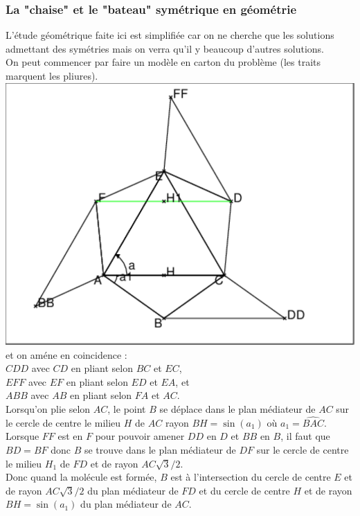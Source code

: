 \documentclass[a4paper,11pt]{book}
\begin{document}
\subsubsection{La "chaise" et le "bateau" sym\'etrique en g\'eom\'etrie}
L'\'etude g\'eom\'etrique faite ici est simplifi\'ee car on ne cherche que les 
solutions admettant des sym\'etries mais on verra qu'il y beaucoup d'autres 
solutions. \\
 On peut commencer par faire un mod\`ele en carton du probl\`eme (les traits 
marquent les pliures).\\
\includegraphics[width=\textwidth]{cyclohex1}\\
et on am\'ene en coincidence :\\
$CDD$ avec $CD$ en pliant selon $BC$ et $EC$,\\
 $EFF$ avec $EF$ en pliant selon $ED$ et $EA$, et\\
 $ABB$ avec $AB$ en pliant selon $FA$ et $AC$.\\
Lorsqu'on plie selon $AC$, le point $B$ se d\'eplace dans le plan m\'ediateur 
de $AC$ sur le cercle de centre le milieu $H$ de $AC$ rayon $BH=\sin(a_1)$ 
o\`u $a_1=\widehat{BAC}$.\\
Lorsque  $FF$ est en $F$ pour pouvoir amener  $DD$ en $D$ et $BB$ en $B$, il 
faut que $BD=BF$ donc $B$ se trouve dans le plan m\'ediateur de $DF$ sur le 
cercle de centre le milieu $H_1$ de $FD$ et de rayon $AC\sqrt 3/2$.\\
Donc quand la mol\'ecule est form\'ee, $B$ est \`a l'intersection du cercle de 
centre $E$ et de rayon $AC\sqrt 3/2$ du plan m\'ediateur de $FD$ et du cercle 
de centre $H$ et de rayon $BH=\sin(a_1)$ du plan m\'ediateur de $AC$.\\
\end{document}
